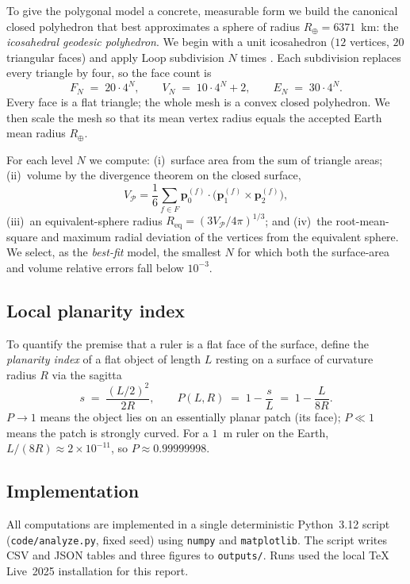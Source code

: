 \documentclass[11pt,a4paper]{article}
\begin{document}
To give the polygonal model a concrete, measurable form we build the canonical closed polyhedron that best approximates a sphere of radius $R_\oplus=6371$~km: the \emph{icosahedral geodesic polyhedron}. We begin with a unit icosahedron ($12$ vertices, $20$ triangular faces) and apply Loop subdivision $N$ times \cite{loop1987smooth,bauchau2011mesh}. Each subdivision replaces every triangle by four, so the face count is
\begin{equation}
F_N \;=\; 20\cdot 4^{N}, \qquad V_N \;=\; 10\cdot 4^{N}+2, \qquad E_N \;=\; 30\cdot 4^{N}.
\label{eq:counts}
\end{equation}
Every face is a flat triangle; the whole mesh is a convex closed polyhedron. We then scale the mesh so that its mean vertex radius equals the accepted Earth mean radius $R_\oplus$.

For each level $N$ we compute: (i)~surface area from the sum of triangle areas; (ii)~volume by the divergence theorem on the closed surface,
\[
V_{\mathcal P} = \frac{1}{6}\sum_{f\in F}\mathbf{p}_0^{(f)}\cdot\big(\mathbf{p}_1^{(f)}\times \mathbf{p}_2^{(f)}\big),
\]
(iii)~an equivalent-sphere radius $R_{\mathrm{eq}} = (3V_{\mathcal P}/4\pi)^{1/3}$; and (iv)~the root-mean-square and maximum radial deviation of the vertices from the equivalent sphere. We select, as the \emph{best-fit} model, the smallest $N$ for which both the surface-area and volume relative errors fall below $10^{-3}$.

\subsection{Local planarity index}
\label{sec:planarity}

To quantify the premise that a ruler is a flat face of the surface, define the \emph{planarity index} of a flat object of length $L$ resting on a surface of curvature radius $R$ via the sagitta
\begin{equation}
s \;=\; \frac{(L/2)^2}{2R},\qquad
P(L,R) \;=\; 1 - \frac{s}{L} \;=\; 1 - \frac{L}{8R}.
\label{eq:planarity}
\end{equation}
$P\to 1$ means the object lies on an essentially planar patch (its face); $P\ll 1$ means the patch is strongly curved. For a $1$~m ruler on the Earth, $L/(8R)\approx 2\times10^{-11}$, so $P\approx 0.99999998$.

\subsection{Implementation}
\label{sec:impl}
All computations are implemented in a single deterministic Python~3.12 script (\texttt{code/analyze.py}, fixed seed) using \texttt{numpy} and \texttt{matplotlib}. The script writes CSV and JSON tables and three figures to \texttt{outputs/}. Runs used the local TeX Live~2025 installation for this report.
\end{document}
